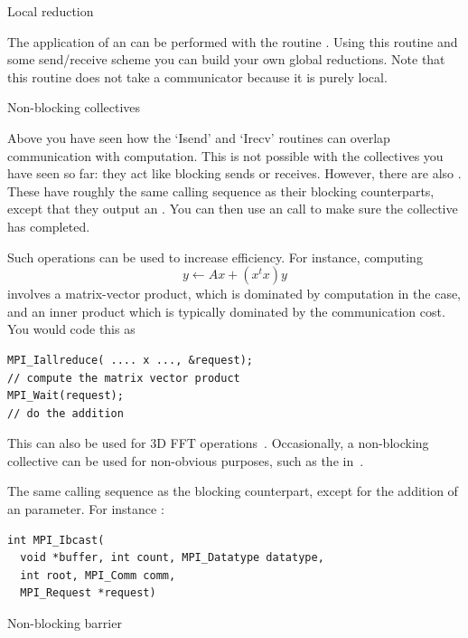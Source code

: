  {Local reduction}

The application of an  can be performed with the routine
. Using this routine and some
send/receive scheme you can build your own global reductions. Note
that this routine does not take a communicator because it is purely local.



 {Non-blocking collectives}
\label{sec:mpi3collect}

Above you have seen how the `Isend' and `Irecv' routines can overlap communication
with computation. This is not possible with the collectives you have seen so far:
they act like blocking sends or receives.
However, there are also .
These have roughly the same calling sequence as their blocking counterparts,
except that they output an . You
can then use an  call to make sure the collective
has completed.

Such operations can be used to increase efficiency.
For instance, computing
\[ y \leftarrow Ax + (x^tx)y \]
involves a matrix-vector product, which is dominated by computation
in the  case, and an inner product which is 
typically dominated by the communication cost. You would code this as
\begin{lstlisting}
MPI_Iallreduce( .... x ..., &request);
// compute the matrix vector product
MPI_Wait(request);
// do the addition
\end{lstlisting}

This can also be used for 3D FFT operations~\cite{Hoefler:case-for-nbc}.
Occasionally, a non-blocking collective can be used for non-obvious purposes,
such as the  in~\cite{Hoefler:2010:SCP}.

The same calling sequence as the blocking counterpart, except for the addition
of an  parameter. For instance 
:
\begin{lstlisting}
int MPI_Ibcast(
  void *buffer, int count, MPI_Datatype datatype,
  int root, MPI_Comm comm, 
  MPI_Request *request)
\end{lstlisting}



 {Non-blocking barrier}
\label{sec:ibarrier}

